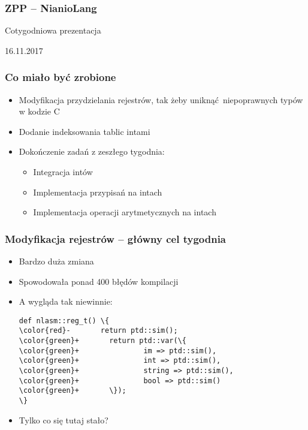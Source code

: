 \documentclass{beamer}
\begin{document}
	\begin{frame}
		\frametitle{ZPP -- NianioLang}
		Cotygodniowa prezentacja
		
		16.11.2017
	\end{frame}
	
	\begin{frame}
		\frametitle{Co miało być zrobione}
		\begin{itemize}
			\item Modyfikacja przydzielania rejestrów, tak żeby uniknąć niepoprawnych typów w kodzie C
			\item Dodanie indeksowania tablic intami
			\item Dokończenie zadań z zeszłego tygodnia:
			\begin{itemize}
				\item Integracja intów
				\item Implementacja przypisań na intach
				\item Implementacja operacji arytmetycznych na intach
			\end{itemize}
		\end{itemize}
	\end{frame}
	
	\begin{frame}[fragile]
		\frametitle{Modyfikacja rejestrów -- główny cel tygodnia}
		\begin{itemize}
			\item Bardzo duża zmiana
			\item Spowodowała ponad 400 błędów kompilacji
			\item A wygląda tak niewinnie:\newline
			\begin{Verbatim}[commandchars=\\\{\}]
def nlasm::reg_t() \{
\color{red}-       return ptd::sim();
\color{green}+       return ptd::var(\{
\color{green}+               im => ptd::sim(),
\color{green}+               int => ptd::sim(),
\color{green}+               string => ptd::sim(),
\color{green}+               bool => ptd::sim()
\color{green}+       \});
\}
			\end{Verbatim}
		\pause
		\item Tylko co się tutaj stało?
		\end{itemize}
	\end{frame}
	
\end{document}
